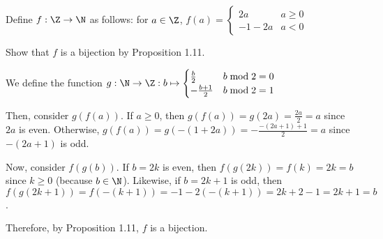 \begin{xca}
  Define $f : \Z \to \N$ as follows: for $a \in \Z$,
  $f(a) = \begin{cases}
      2a    & a \geq 0 \\
      -1-2a & a < 0
    \end{cases}$

  Show that $f$ is a bijection by Proposition 1.11.
\end{xca}
\begin{prf}
  We define the function $g : \N \to \Z : b \mapsto \begin{cases}
      \frac{b}{2}    & b \bmod 2 = 0 \\
      -\frac{b+1}{2} & b \bmod 2 = 1
    \end{cases}$

  Then, consider $g(f(a))$.
  If $a \geq 0$, then $g(f(a)) = g(2a) = \frac{2a}{2} = a$ since $2a$ is even.
  Otherwise, $g(f(a)) = g(-(1+2a)) = -\frac{-(2a+1)+1}{2} = a$ since $-(2a+1)$ is odd.

  Now, consider $f(g(b))$.
  If $b = 2k$ is even, then $f(g(2k)) = f(k) = 2k = b$ since $k \geq 0$ (because $b \in \N$).
  Likewise, if $b = 2k+1$ is odd, then $f(g(2k+1)) = f(-(k+1)) = -1-2(-(k+1)) = 2k+2-1 = 2k+1 = b$.

  Therefore, by Proposition 1.11, $f$ is a bijection.
\end{prf}

